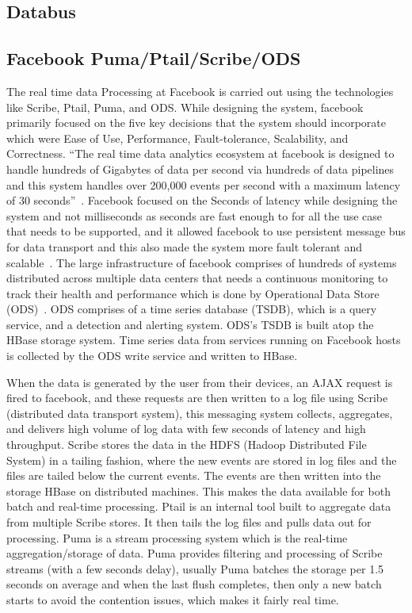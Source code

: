      \pv

\subsection{Databus}

\pv 

\subsection{Facebook Puma/Ptail/Scribe/ODS}
     
The real time data Processing at Facebook is carried out using the
technologies like Scribe, Ptail, Puma, and ODS. While designing the
system, facebook primarily focused on the five key decisions that the
system should incorporate which were Ease of Use, Performance,
Fault-tolerance, Scalability, and Correctness. ``The real time data
analytics ecosystem at facebook is designed to handle hundreds of
Gigabytes of data per second via hundreds of data pipelines and this
system handles over 200,000 events per second with a maximum latency
of 30 seconds''~\cite{www-facebook}. Facebook focused on the Seconds
of latency while designing the system and not milliseconds as seconds
are fast enough to for all the use case that needs to be supported,
and it allowed facebook to use persistent message bus for data
transport and this also made the system more fault tolerant and
scalable~\cite{www-facebook}. The large infrastructure of facebook
comprises of hundreds of systems distributed across multiple data
centers that needs a continuous monitoring to track their health and
performance which is done by Operational Data Store
(ODS)~\cite{facebook-paper-2016}. ODS comprises of a time series
database (TSDB), which is a query service, and a detection and
alerting system. ODS’s TSDB is built atop the HBase storage
system. Time series data from services running on Facebook hosts is
collected by the ODS write service and written to HBase.

     When the data is generated by the user from their devices, an
     AJAX request is fired to facebook, and these requests are then
     written to a log file using Scribe (distributed data transport
     system), this messaging system collects, aggregates, and delivers
     high volume of log data with few seconds of latency and high
     throughput. Scribe stores the data in the HDFS (Hadoop
     Distributed File System) in a tailing fashion, where the new
     events are stored in log files and the files are tailed below the
     current events. The events are then written into the storage
     HBase on distributed machines. This makes the data available for
     both batch and real-time processing. Ptail is an internal tool
     built to aggregate data from multiple Scribe stores. It then
     tails the log files and pulls data out for processing. Puma is a
     stream processing system which is the real-time
     aggregation/storage of data. Puma provides filtering and
     processing of Scribe streams (with a few seconds delay), usually
     Puma batches the storage per 1.5 seconds on average and when the
     last flush completes, then only a new batch starts to avoid the
     contention issues, which makes it fairly real time.
     
